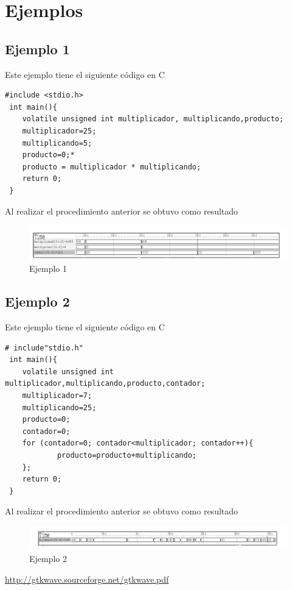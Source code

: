 \documentclass[10pt,graphicx,caption,rotating]{article}
\begin{document}
\section{Ejemplos}
\subsection{Ejemplo 1}
\noindent
Este ejemplo tiene el siguiente código en C
\lstset{numbers=left, numberstyle=\tiny, stepnumber=1, numbersep=1pt}
\begin{lstlisting}[firstnumber=1, caption=Ejemplo 1 - Multiplicación, label=code2]
 #include <stdio.h>
 int main(){
	volatile unsigned int multiplicador, multiplicando,producto;
	multiplicador=25;
	multiplicando=5;
	producto=0;*
	producto = multiplicador * multiplicando;
	return 0;
 }
\end{lstlisting}
\noindent
Al realizar el procedimiento anterior se obtuvo como resultado
\begin{figure}[H]
	\centering
		\includegraphics[scale=0.55]{example1.png}
	\caption{Ejemplo 1}
	\label{fig5}
\end{figure}

\subsection{Ejemplo 2}
\noindent
Este ejemplo tiene el siguiente código en C
\begin{lstlisting}[firstnumber=1, caption=Ejemplo 2 - Sumas sucesivas, label=code2]
 # include"stdio.h"
 int main(){
	volatile unsigned int multiplicador,multiplicando,producto,contador;
	multiplicador=7;
	multiplicando=25;
	producto=0;
	contador=0;
	for (contador=0; contador<multiplicador; contador++){
        	producto=producto+multiplicando;                                        
	};
	return 0;
 }
\end{lstlisting}
\noindent
Al realizar el procedimiento anterior se obtuvo como resultado
\begin{figure}[H]
	\centering
		\includegraphics[scale=0.55]{example2.png}
	\caption{Ejemplo 2}
	\label{fig6}
\end{figure}


\begin{thebibliography}{99}
 \url{http://gtkwave.sourceforge.net/gtkwave.pdf}
\end{thebibliography}
\end{document}
